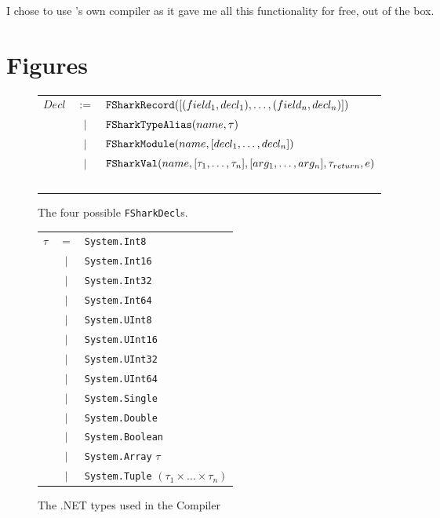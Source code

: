 I chose to use \fsharp{}'s own compiler as it gave me all this functionality for
free, out of the box.

\clearpage
\section{Figures}
\begin{figure}
  \centering
\begin{tabular}{@{}l c l}%
  $Decl$ & $:=$    & $\text{\ttfamily FSharkRecord}([(field_1, decl_1),\ldots,(field_n, decl_n)])$ \\
         & $\vert$ & $\text{\ttfamily FSharkTypeAlias}(name, \tau)$ \\
         & $\vert$ & $\text{\ttfamily FSharkModule}(name, [decl_1,\ldots, decl_n])$\\
         & $\vert$ & $\text{\ttfamily FSharkVal}(name, [\tau_1, \ldots, \tau_n], [arg_1, \ldots, arg_n], \tau_{return}, e)$\\
  ~ \\
\end{tabular}
\caption{The four possible \texttt{FSharkDecl}s.}
\label{fig:fsharkdecls}
\end{figure}

\begin{figure}
  \centering
\begin{tabular}{l c l}%
   $\tau$& $=$     &  \texttt{System.Int8} \\
         & $\vert$ &  \texttt{System.Int16} \\
         & $\vert$ &  \texttt{System.Int32} \\
         & $\vert$ &  \texttt{System.Int64} \\
         & $\vert$ &  \texttt{System.UInt8} \\
         & $\vert$ &  \texttt{System.UInt16} \\
         & $\vert$ &  \texttt{System.UInt32} \\
         & $\vert$ &  \texttt{System.UInt64} \\
         & $\vert$ &  \texttt{System.Single} \\
         & $\vert$ &  \texttt{System.Double} \\
         & $\vert$ &  \texttt{System.Boolean} \\
         & $\vert$ &  \texttt{System.Array} $\tau$ \\
         & $\vert$ &  \texttt{System.Tuple} $(\tau_1 \times \ldots \times \tau_n)$ \\
\end{tabular}
\caption{The .NET types used in the \fshark{}Compiler}
\label{fig:fsharptypes0}
\end{figure}


